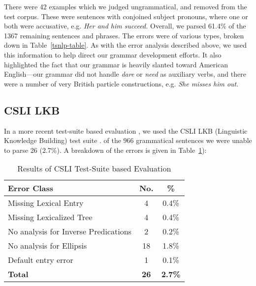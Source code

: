 There were 42 examples which we judged ungrammatical, and removed from
the test corpus. These were sentences with conjoined subject pronouns,
where one or both were accusative, e.g. {\it Her and him succeed.}
Overall, we parsed 61.4\% of the 1367 remaining sentences and
phrases. The errors were of various types, broken down in
Table~\ref{tsnlp-table}. As with the error analysis described above,
we used this information to help direct our grammar development
efforts. It also highlighted the fact
that our grammar is heavily slanted toward American English---our
grammar did not handle {\it dare} or {\it need} as auxiliary verbs,
and there were a number of very British particle constructions,
e.g. {\it She misses him out}.

\subsection{CSLI LKB}

In a more recent test-suite based evaluation \cite{prasadandsarkar00}, we
used the CSLI LKB (Linguistic Knowledge Building) test suite
\cite{copestake99:_lkb_system}. of the 966 grammatical sentences we were
unable to parse 26 (2.7\%). A breakdown of the errors is given in
Table~\ref{tab:CSLI_analysis}):

\begin{table}[htb]
\centering
\begin{tabular}{|l|c|c|} \hline \hline
Error Class & No. & \% \\ \hline \hline
Missing Lexical Entry & 4 & 0.4\% \\ \hline
Missing Lexicalized Tree & 4 & 0.4\% \\ \hline
No analysis for Inverse Predications & 2 & 0.2\% \\ \hline
No analysis for Ellipsis & 18 & 1.8\% \\ \hline
Default entry error & 1 & 0.1\% \\ \hline
{\bf Total} & {\bf 26} & {\bf 2.7\%} \\ \hline
\end{tabular}
 \caption{\label{tab:CSLI_analysis} Results of CSLI Test-Suite based Evaluation}
\end{table}

